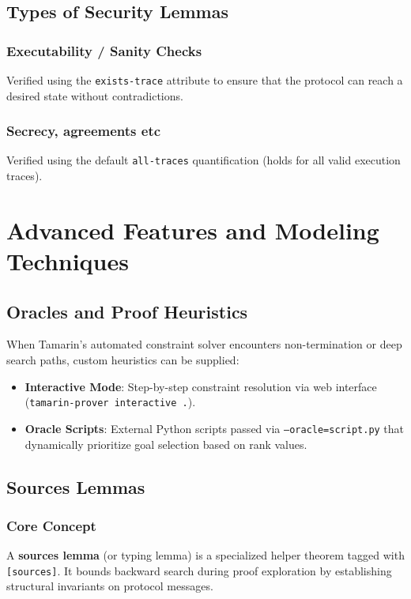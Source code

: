 \documentclass[11pt,a4paper]{article}
\begin{document}
\subsection{Types of Security Lemmas}

\subsubsection{Executability / Sanity Checks}
Verified using the \texttt{exists-trace} attribute to ensure that the protocol can reach a desired state without contradictions.


\subsubsection{Secrecy, agreements etc}
Verified using the default \texttt{all-traces} quantification (holds for all valid execution traces).


\section{Advanced Features and Modeling Techniques}

\subsection{Oracles and Proof Heuristics}
When Tamarin's automated constraint solver encounters non-termination or deep search paths, custom heuristics can be supplied:
\begin{itemize}
    \item \textbf{Interactive Mode}: Step-by-step constraint resolution via web interface (\texttt{tamarin-prover interactive .}).
    \item \textbf{Oracle Scripts}: External Python scripts passed via \texttt{--oracle=script.py} that dynamically prioritize goal selection based on rank values.
\end{itemize}


\subsection{Sources Lemmas}

\subsubsection{Core Concept}
A \textbf{sources lemma} (or typing lemma) is a specialized helper theorem tagged with \texttt{[sources]}. It bounds backward search during proof exploration by establishing structural invariants on protocol messages.
\end{document}
